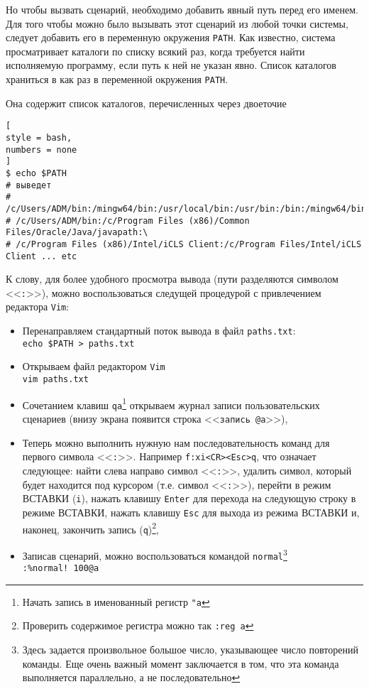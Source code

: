 \documentclass[%
	11pt,
	a4paper,
	utf8,
		]{article}
\begin{document}
Но чтобы вызвать сценарий, необходимо добавить явный путь перед его именем. Для того чтобы можно было вызывать этот сценарий из любой точки системы, следует добавить его в переменную окружения \texttt{PATH}. Как известно, система просматривает каталоги по списку всякий раз, когда требуется найти исполняемую программу, если путь к ней не указан явно. Список каталогов храниться в как раз в переменной окружения \texttt{PATH}.

Она содержит список каталогов, перечисленных через двоеточие
\begin{lstlisting}[
style = bash,
numbers = none
]
$ echo $PATH
# выведет
# /c/Users/ADM/bin:/mingw64/bin:/usr/local/bin:/usr/bin:/bin:/mingw64/bin:/usr/bin:\
# /c/Users/ADM/bin:/c/Program Files (x86)/Common Files/Oracle/Java/javapath:\
# /c/Program Files (x86)/Intel/iCLS Client:/c/Program Files/Intel/iCLS Client ... etc
\end{lstlisting}

К слову, для более удобного просмотра вывода (пути разделяются символом <<\texttt{:}>>), можно воспользоваться следущей процедурой с привлечением редактора \texttt{Vim}:
\begin{itemize}
	\item Перенаправляем стандартный поток вывода в файл \texttt{paths.txt}: \\\verb|echo $PATH > paths.txt|
	
	\item Открываем файл редактором \texttt{Vim}\\\verb|vim paths.txt|
	
	\item Сочетанием клавиш \texttt{qa}\footnote{Начать запись в именованный регистр \texttt{"a}} открываем журнал записи пользовательских сценариев (внизу экрана появится строка <<\verb|запись @a|>>),
	
	\item Теперь можно выполнить нужную нам последовательность команд для первого символа <<\texttt{:}>>. Например \verb|f:xi<CR><Esc>q|, что означает следующее: найти слева направо символ <<\texttt{:}>>, удалить символ, который будет находится под курсором (т.е. символ <<\texttt{:}>>), перейти в режим ВСТАВКИ (\texttt{i}), нажать клавишу \texttt{Enter} для перехода на следующую строку в режиме ВСТАВКИ, нажать клавишу \texttt{Esc} для выхода из режима ВСТАВКИ и, наконец, закончить запись (\texttt{q})\footnote{Проверить содержимое регистра можно так \texttt{:reg a}},
	
	\item Записав сценарий, можно воспользоваться командой \texttt{normal}\footnote{Здесь задается произвольное большое число, указывающее число повторений команды. Еще очень важный момент заключается в том, что эта команда выполняется параллельно, а не последовательно} \\\verb|:%normal! 100@a|
\end{itemize}
\end{document}
